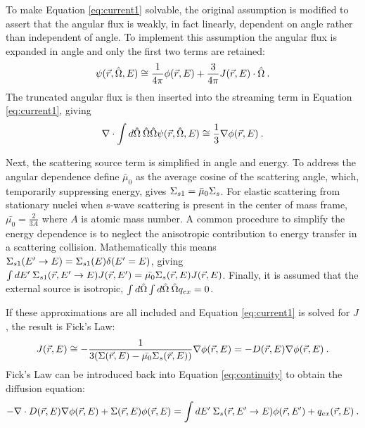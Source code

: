 To make Equation \eqref{eq:current1} solvable, the original assumption is modified to assert that the angular flux is weakly, in fact linearly, dependent on angle rather than independent of angle. To implement this assumption the angular flux is expanded in angle and only the first two terms are retained:  
%
\begin{equation}
  \psi(\vec{r}, \hat{\Omega}, E) \cong \frac{1}{4 \pi} \phi(\vec{r}, E) + \frac{3}{4 \pi}J(\vec{r}, E) \cdot \hat{\Omega} \:.
  \label{eq:angExpand} 
\end{equation}
The truncated angular flux is then inserted into the streaming term in Equation \eqref{eq:current1}, giving 
%
\begin{equation}
  \nabla \cdot \int d \hat{\Omega} \:\hat{\Omega} \hat{\Omega} \psi(\vec{r}, \hat{\Omega}, E)  \cong \frac{1}{3} \nabla \phi(\vec{r}, E) \:. 
  \label{eq:firstTerm}
\end{equation}

Next, the scattering source term is simplified in angle and energy. To address the angular dependence define $\bar{\mu}_{0}$ as the average cosine of the scattering angle, which, temporarily suppressing energy, gives $\Sigma_{s1} = \bar{\mu}_{0}\Sigma_{s}$. For elastic scattering from stationary nuclei when s-wave scattering is present in the center of mass frame, $\bar{\mu_{0}} = \frac{2}{3A}$ where $A$ is atomic mass number. A common procedure to simplify the energy dependence is to neglect the anisotropic contribution to energy transfer in a scattering collision. Mathematically this means $\Sigma_{s1}(E' \to E) = \Sigma_{s1}(E) \delta(E' = E)$, giving $\int dE' \:\Sigma_{s1}(\vec{r}, E' \to E)J(\vec{r},E') = \bar{\mu_{0}}\Sigma_{s}(\vec{r},E)J(\vec{r},E)$. Finally, it is assumed that the external source is isotropic, $\int  d\hat{\Omega} \int d\hat{\Omega} \:\hat{\Omega} q_{ex} = 0$.

If these approximations are all included and Equation \eqref{eq:current1} is solved for $J$, the result is Fick's Law:
%
\begin{equation}
  J(\vec{r},E) \cong -\frac{1}{3(\Sigma(\vec{r},E) - \bar{\mu_{0}}\Sigma_{s}(\vec{r},E))} \nabla \phi (\vec{r},E) = -D(\vec{r},E) \nabla \phi (\vec{r},E) \:.
\end{equation}
%
Fick's Law can be introduced back into Equation \eqref{eq:continuity} to obtain the diffusion equation:
%
\begin{equation}
  -\nabla \cdot D(\vec{r},E) \nabla \phi(\vec{r},E) + \Sigma(\vec{r},E)\phi(\vec{r},E) = \int dE' \:\Sigma_{s}(\vec{r}, E' \to E)\phi(\vec{r},E') + q_{ex}(\vec{r},E) \:.
  \label{eq:diffusion}
\end{equation}

